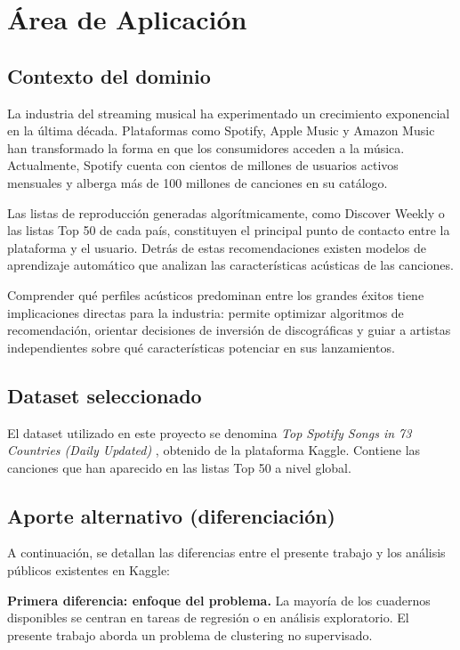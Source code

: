 \section{Área de Aplicación}

\subsection{Contexto del dominio}

La industria del streaming musical ha experimentado un crecimiento exponencial en la última década. Plataformas como Spotify, Apple Music y Amazon Music han transformado la forma en que los consumidores acceden a la música. Actualmente, Spotify cuenta con cientos de millones de usuarios activos mensuales y alberga más de 100 millones de canciones en su catálogo.

Las listas de reproducción generadas algorítmicamente, como Discover Weekly o las listas Top 50 de cada país, constituyen el principal punto de contacto entre la plataforma y el usuario. Detrás de estas recomendaciones existen modelos de aprendizaje automático que analizan las características acústicas de las canciones.

Comprender qué perfiles acústicos predominan entre los grandes éxitos tiene implicaciones directas para la industria: permite optimizar algoritmos de recomendación, orientar decisiones de inversión de discográficas y guiar a artistas independientes sobre qué características potenciar en sus lanzamientos.

\subsection{Dataset seleccionado}

El dataset utilizado en este proyecto se denomina \textit{Top Spotify Songs in 73 Countries (Daily Updated)} \cite{asaniczka2025}, obtenido de la plataforma Kaggle. Contiene las canciones que han aparecido en las listas Top 50 a nivel global.

\subsection{Aporte alternativo (diferenciación)}

A continuación, se detallan las diferencias entre el presente trabajo y los análisis públicos existentes en Kaggle:

\textbf{Primera diferencia: enfoque del problema.} La mayoría de los cuadernos disponibles se centran en tareas de regresión o en análisis exploratorio. El presente trabajo aborda un problema de clustering no supervisado.

